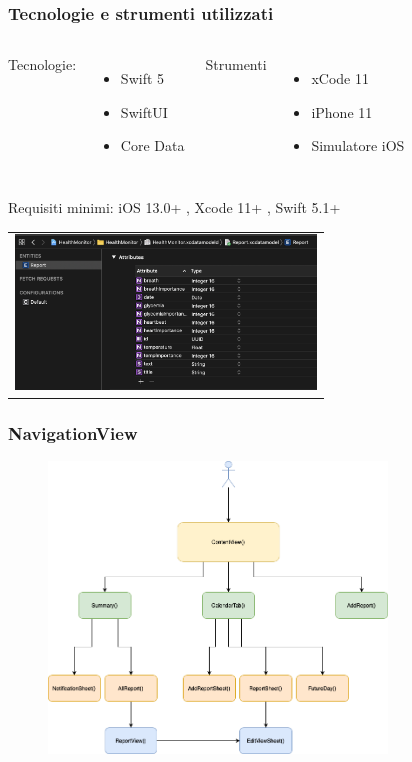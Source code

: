 \documentclass{beamer}
\begin{document}
\begin{frame}
\frametitle{Tecnologie e strumenti utilizzati}
\begin{columns}
Tecnologie:
	\begin{itemize}
 	 \item Swift 5 
  	\item SwiftUI
  	\item Core Data
	\end{itemize}
	
Strumenti
\begin{itemize}
  \item xCode 11
  \item iPhone 11
  \item Simulatore iOS
\end{itemize}
\end{columns}
	\vspace{0.4cm}
	Requisiti minimi: iOS 13.0+ , Xcode 11+ , Swift 5.1+ \\
		\vspace{0.4cm}
      \centering  \begin{tabular}{c}
        \includegraphics[width=8cm]{../img/CoreData.png}
      \end{tabular}
\end{frame}

\begin{frame}
\frametitle{NavigationView}
  \begin{figure}[h]
  	\centering 
        \includegraphics[width=9cm]{../img/NavigationView.png}
   \end{figure}
\end{frame}
\end{document}
